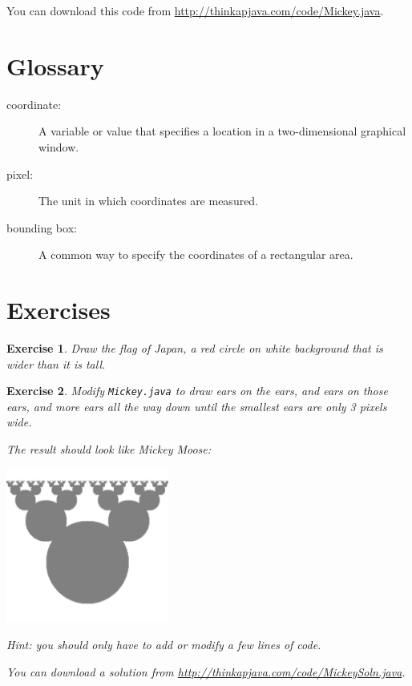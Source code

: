\documentclass[12pt]{book}
\theoremstyle{exercise}
\newtheorem{exercise}{Exercise}[chapter]
\begin{document}
You can download this code from
\url{http://thinkapjava.com/code/Mickey.java}.


\section{Glossary}

\begin{description}

\item[coordinate:]  A variable or value that specifies a location
in a two-dimensional graphical window.

\item[pixel:]  The unit in which coordinates are measured.

\item[bounding box:]  A common way to specify the coordinates of
a rectangular area.


\end{description}


\section{Exercises}

\begin{exercise}
Draw the flag of Japan, a red circle on white background
that is wider than it is tall.
\end{exercise}


\begin{exercise}
Modify {\tt Mickey.java} to draw ears on the ears, and ears on those
ears, and more ears all the way down until the smallest ears are
only 3 pixels wide.

The result should look like Mickey Moose:

\includegraphics[height=2in]{figs/moose.pdf}

Hint: you should only have to add or modify a few lines of code.

You can download a solution from
\url{http://thinkapjava.com/code/MickeySoln.java}.

\end{exercise}
\end{document}
